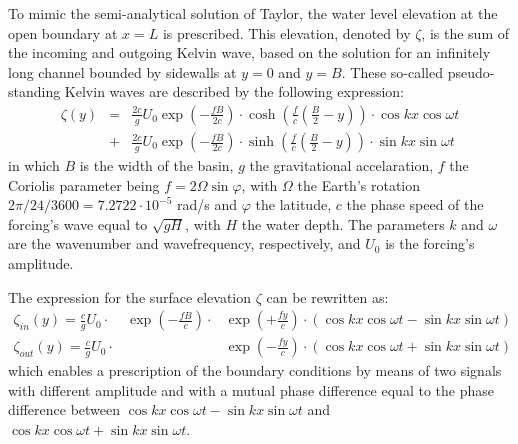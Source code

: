 To mimic the semi-analytical solution of Taylor, the water level elevation at the open boundary at $x=L$ is prescribed. This elevation, denoted by $\zeta$, is the sum of the incoming and outgoing Kelvin wave, based on the solution for an infinitely long channel bounded by sidewalls at $y = 0$ and $y = B$. These so-called pseudo-standing Kelvin waves are described by the following expression:
\begin{eqnarray}
\zeta(y) &=& \frac{2c}{g}U_0 \exp \left(-\frac{fB}{2c} \right) \cdot  \cosh \left(\frac{f}{c} \left(\frac{B}{2}-y \right) \right) \cdot \cos kx \cos \omega t   \\
         &+& \frac{2c}{g}U_0 \exp \left(-\frac{fB}{2c} \right) \cdot  \sinh \left(\frac{f}{c} \left(\frac{B}{2}-y \right) \right) \cdot \sin kx \sin \omega t
\end{eqnarray}
in which $B$ is the width of the basin, $g$ the gravitational accelaration, $f$ the Coriolis parameter being $f = 2 \Omega \sin \varphi$, with $\Omega$ the Earth's rotation $2\pi/24/3600 = 7.2722\cdot10^{-5}$ rad/s and $\varphi$ the latitude, $c$ the phase speed of the forcing's wave equal to $\sqrt{gH}$, with $H$ the water depth. The parameters $k$ and $\omega$ are the wavenumber and wavefrequency, respectively, and $U_0$ is the forcing's amplitude.

The expression for the surface elevation $\zeta$ can be rewritten as:
\begin{eqnarray}
\zeta_{in}(y) = \frac{c}{g}U_0 \cdot &\exp \left(-\frac{fB}{c}\right) \cdot &\exp \left(+ \frac{fy}{c} \right) \cdot \left(\cos kx \cos \omega t - \sin kx \sin \omega t   \right) \\
\zeta_{out}(y) = \frac{c}{g}U_0 \cdot &  &\exp \left(-\frac{fy}{c} \right) \cdot \left(\cos kx \cos \omega t + \sin kx \sin \omega t   \right)
\end{eqnarray}
which enables a prescription of the boundary conditions by means of two signals with different amplitude and with a mutual phase difference equal to the phase difference between $\cos kx \cos \omega t - \sin kx \sin \omega t$ and $\cos kx \cos \omega t + \sin kx \sin \omega t$.


